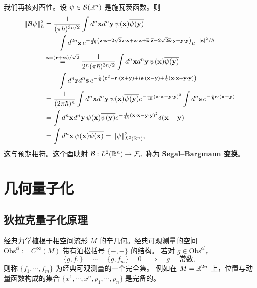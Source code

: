 我们再核对酉性。设 $\psi\in\mathcal{S}(\mathbb{R}^n)$ 是施瓦茨函数。则
\[
\begin{aligned}
\lVert \mathcal{B}\psi\rVert_\hbar^2
&=\frac{1}{(\pi\hbar)^{3n/2}}\int d^n\mathbf xd^n\mathbf y\,
\psi(\mathbf x)\overline{\psi(\mathbf y)}\\
&\qquad\int d^{2n}\mathbf z\,
e^{-\frac{1}{2\hbar}\left(\mathbf z\cdot\mathbf z-2\sqrt2\mathbf z\cdot\mathbf x
+\mathbf x\cdot\mathbf x+\overline{\mathbf z}\cdot\overline{\mathbf z}
-2\sqrt2\overline{\mathbf z}\cdot\mathbf y+\mathbf y\cdot\mathbf y\right)}
e^{-\lvert \mathbf z\rvert^2/\hbar}\\
&\stackrel{\mathbf z=(\mathbf r+i\mathbf s)/\sqrt2}{=}
\frac{1}{2^n(\pi\hbar)^{3n/2}}\int d^n\mathbf xd^n\mathbf y\,
\psi(\mathbf x)\overline{\psi(\mathbf y)}\\
&\qquad\int d^n\mathbf rd^n\mathbf s\,
e^{-\frac{1}{\hbar}\left(\mathbf r^2-\mathbf r\cdot(\mathbf x+\mathbf y)
+i\mathbf s\cdot(\mathbf x-\mathbf y)+\frac12(\mathbf x\cdot\mathbf x+\mathbf y\cdot\mathbf y)\right)}\\
&=\frac{1}{(2\pi\hbar)^n}\int d^n\mathbf xd^n\mathbf y\,
\psi(\mathbf x)\overline{\psi(\mathbf y)}
e^{-\frac{1}{4\hbar}(\mathbf x\cdot\mathbf x-\mathbf y\cdot\mathbf y)^2}
\int d^n\mathbf s\,e^{-\frac{i}{\hbar}\mathbf s\cdot(\mathbf x-\mathbf y)}\\
&=\int d^n\mathbf xd^n\mathbf y\,\psi(\mathbf x)\overline{\psi(\mathbf y)}
e^{-\frac{1}{4\hbar}(\mathbf x\cdot\mathbf x-\mathbf y\cdot\mathbf y)^2}
\delta(\mathbf x-\mathbf y)\\
&=\int d^n\mathbf x\,\psi(\mathbf x)\overline{\psi(\mathbf x)}
=\lVert \psi\rVert_{L^2(\mathbb{R}^n)}^2,
\end{aligned}
\]
这与预期相符。这个酉映射 $\mathcal{B}:L^2(\mathbb{R}^n)\to\mathcal{F}_n$ 称为
\textbf{Segal–Bargmann 变换}。


\section{几何量子化}
\subsection{狄拉克量子化原理}

经典力学植根于相空间流形 $M$ 的辛几何。经典可观测量的空间
$\mathrm{Obs}^{cl}:=C^\infty(M)$ 带有泊松括号 $\{-,-\}$ 的结构。
若对 $g\in\mathrm{Obs}^{cl}$，
\[
\{g,f_1\}=\cdots=\{g,f_m\}=0
\quad\Longrightarrow\quad g=\text{常数},
\]
则称 $\{f_1,\cdots,f_m\}$ 为经典可观测量的一个完全集。
例如在 $M=\mathbb{R}^{2n}$ 上，位置与动量函数构成的集合
$\{x^1,\cdots,x^n,p_1,\cdots,p_n\}$ 是完备的。

